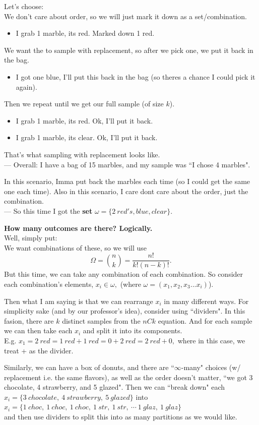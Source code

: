 \documentclass[12pt]{book}
\begin{document}
\noindent Let's choose: \\
We don't care about order, so we will just mark it down as a set/combination.
\begin{itemize}
\item I grab 1 marble, its red. Marked down 1 red.
\end{itemize}
We want the to sample with replacement, so after we pick one, we put it back in the bag. 
\begin{itemize}
\item I got one blue, I'll put this back in the bag (so theres a chance I could pick it again).
\end{itemize}
Then we repeat until we get our full sample (of size $k$). 
\begin{itemize}
\item I grab 1 marble, its red. Ok, I'll put it back. 
\item I grab 1 marble, its clear. Ok, I'll put it back.
\end{itemize}
That's what sampling with replacement looks like. \\
--- Overall: I have a bag of 15 marbles, and my sample was ``I chose 4 marbles". 

In this scenario, Imma put back the marbles each time (so I could get the same one each time). Also in this scenario, I care dont care about the order, just the combination.\\
--- So this time I got the \textbf{set} $\omega =\big\{2~red's, blue, clear\big\}$.

\noindent \textbf{How many outcomes are there? Logically.} \\
Well, simply put:\\
We want combinations of these, so we will use 
$$\Omega = {n \choose k} = \frac{n!}{k!(n-k)!}.$$
But this time, we can take any combination of each combination. So consider each combination's elements, $x_i \in \omega,$ (where $\omega= (x_1,x_2,x_3...x_i)$). 

Then what I am saying is that we can rearrange $x_i$ in many different ways. For simplicity sake (and by our professor's idea), consider using ``dividers". In this fasion, there are $k$ distinct samples from the $nCk$ equation. And for each sample we can then take each $x_i$ and split it into its components. \\
E.g. $x_1 = 2~red = 1~red+1~red = 0+2~red = 2~red+0,$ where in this case, we treat + as the divider.

Similarly, we can have a box of donuts, and there are ``$\infty$-many" choices (w/ replacement i.e. the same flavors), as well as the order doesn't matter, ``we got 3 chocolate, 4 strawberry, and 5 glazed". Then we can ``break down" each \\
$x_i = \{ 3~chocolate,~4~strawberry,~5~glazed \}$ into  \\
$x_i = \{ 1~choc,~ 1~choc,~ 1~choc,~1~str,~ 1~str,~\cdots ~1~glaz,~1~glaz\}$\\
and then use dividers to split this into as many partitions as we would like.
\end{document}
